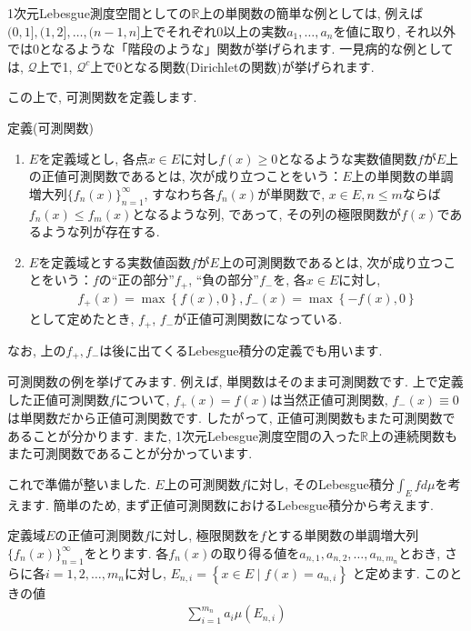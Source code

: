 \par 1次元Lebesgue測度空間としての$\mathbb{R}$上の単関数の簡単な例としては, 例えば$(0,1],(1,2],…,(n-1,n]$上でそれぞれ0以上の実数$a_1,…,a_n$を値に取り, それ以外では0となるような「階段のような」関数が挙げられます. 一見病的な例としては, $\mathcal{Q}$上で1, $\mathcal{Q}^c$上で0となる関数(Dirichletの関数)が挙げられます. 
\par この上で, 可測関数を定義します. 
\begin{itembox}[l]{定義(可測関数)}
\begin{enumerate}
\item $E$を定義域とし, 各点$x\in E$に対し$f(x)\ge 0$となるような実数値関数$f$が$E$上の正値可測関数であるとは, 次が成り立つことをいう：$E$上の単関数の単調増大列$\{f_n(x)\}_{n=1}^{\infty}$, すなわち各$f_n(x)$が単関数で, $x\in E, n\le m$ならば$f_{n}(x) \le f_{m}(x)$となるような列, であって, その列の極限関数が$f(x)$であるような列が存在する. 
\item $E$を定義域とする実数値函数$f$が$E$上の可測関数であるとは, 次が成り立つことをいう：$f$の“正の部分”$f_{+}$, “負の部分”$f_{-}$を, 各$x\in E$に対し, 
\begin{eqnarray}
f_{+}(x)=\max \left\{f(x),0\right\} , f_{-}(x)=\max \left\{-f(x),0\right\} \nonumber
\end{eqnarray}
として定めたとき, $f_{+}$, $f_{-}$が正値可測関数になっている. 
\end{enumerate}
\end{itembox}
\par なお, 上の$f_{+}, f_{-}$は後に出てくるLebesgue積分の定義でも用います. 
\par 可測関数の例を挙げてみます. 例えば, 単関数はそのまま可測関数です. 上で定義した正値可測関数$f$について, $f_{+}(x)=f(x)$は当然正値可測関数, $f_{-}(x)\equiv 0$は単関数だから正値可測関数です. したがって, 正値可測関数もまた可測関数であることが分かります. また, 1次元Lebesgue測度空間の入った$\mathbb{R}$上の連続関数もまた可測関数であることが分かっています. 
\par これで準備が整いました. $E$上の可測関数$f$に対し, そのLebesgue積分$\displaystyle \int_{E}fd\mu$を考えます. 簡単のため, まず正値可測関数におけるLebesgue積分から考えます. 
\par 定義域$E$の正値可測関数$f$に対し, 極限関数を$f$とする単関数の単調増大列$\{f_{n}(x)\}_{n=1}^{\infty}$をとります. 各$f_{n}(x)$の取り得る値を$a_{n,1},a_{n,2},\ldots,a_{n,m_{n}}$とおき, さらに各$i=1,2,\ldots,m_{n}$に対し, $\displaystyle E_{n,i}=\left\{x\in E \mid f(x)=a_{n,i}\right\}$ と定めます. このときの値
\begin{eqnarray}
\sum_{i=1}^{m_{n}}a_{i}\mu\left(E_{n,i}\right) \nonumber
\end{eqnarray}
